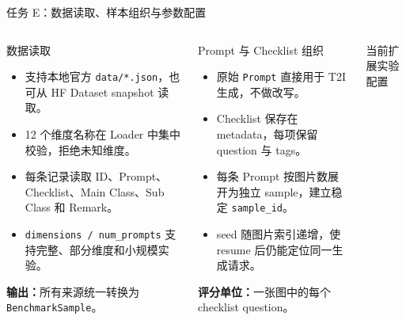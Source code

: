 \documentclass[aspectratio=169,10pt]{beamer}
\begin{document}
\begin{frame}{任务 E：数据读取、样本组织与参数配置}
  \begin{columns}[T,onlytextwidth]
      \begin{block}{数据读取}
        \begin{minipage}[c][4.95cm][c]{\linewidth}
          \begin{itemize}\scriptsize
            \item 支持本地官方 \texttt{data/*.json}，也可从 HF Dataset snapshot 读取。
            \item 12 个维度名称在 Loader 中集中校验，拒绝未知维度。
            \item 每条记录读取 ID、Prompt、Checklist、Main Class、Sub Class 和 Remark。
            \item \texttt{dimensions / num\_prompts} 支持完整、部分维度和小规模实验。
          \end{itemize}
          \vspace{0.35em}
          \scriptsize\textbf{输出：}所有来源统一转换为 \texttt{BenchmarkSample}。
        \end{minipage}
      \end{block}
      \begin{block}{Prompt 与 Checklist 组织}
        \begin{minipage}[c][4.95cm][c]{\linewidth}
          \begin{itemize}\scriptsize
            \item 原始 \texttt{Prompt} 直接用于 T2I 生成，不做改写。
            \item Checklist 保存在 metadata，每项保留 question 与 tags。
            \item 每条 Prompt 按图片数展开为独立 sample，建立稳定 \texttt{sample\_id}。
            \item seed 随图片索引递增，使 resume 后仍能定位同一生成请求。
          \end{itemize}
          \vspace{0.35em}
          \scriptsize\textbf{评分单位：}一张图中的每个 checklist question。
        \end{minipage}
      \end{block}
      \begin{block}{当前扩展实验配置}
        \begin{minipage}[c][4.95cm][c]{\linewidth}
          \begin{itemize}\scriptsize

\end{itemize}
\end{minipage}
\end{block}
\end{columns}
\end{frame}
\end{document}
